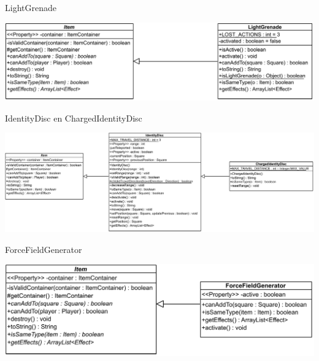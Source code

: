 \documentclass[11pt,t]{beamer}
\begin{document}
\begin{frame}{LightGrenade}
\vspace{0.5in}
\begin{center}
\includegraphics[width=0.9\linewidth]{images/lightgrenade}
\end{center}
\end{frame}

\begin{frame}{IdentityDisc en ChargedIdentityDisc}
\vspace{0.35in}
\begin{center}
\includegraphics[width=0.95\linewidth]{images/identitydisc}
\end{center}
\end{frame}

\begin{frame}{ForceFieldGenerator}
\vspace{0.4in}
\begin{center}
\includegraphics[width=0.95\linewidth]{images/ForceFieldGenerator}
\end{center}
\end{frame}
\end{document}
